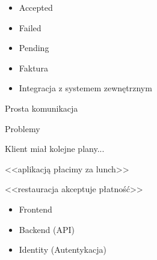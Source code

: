 \documentclass{beamer}
\begin{document}
\begin{frame}{}
	\begin{huge}
		\begin{itemize}[<+->]
			\item Accepted
			\item Failed
			\item Pending
		\end{itemize}
	\end{huge}
\end{frame}

\begin{frame}{}
	\begin{huge}
		\begin{itemize}[<+->]
			\item Faktura
			\item Integracja z systemem zewnętrznym
		\end{itemize}
	\end{huge}
\end{frame}

\begin{frame}{}
	\begin{center}
		\huge{Prosta komunikacja}
	\end{center}
\end{frame}

\begin{frame}{}
	\begin{center}
		\huge{Problemy}
	\end{center}
\end{frame}

\begin{frame}{}
	\begin{center}
		\Huge{Klient miał kolejne plany...}
	\end{center}
\end{frame}

\begin{frame}{}
	\begin{center}
		\huge{<<aplikacją płacimy za lunch>>}
	\end{center}
\end{frame}

\begin{frame}{}
	\begin{center}
		\huge{<<restauracja akceptuje płatność>>}
	\end{center}
\end{frame}

\begin{frame}{}
	\begin{huge}
		\begin{itemize}
			\item Frontend
			\item Backend (API)
			\item Identity (Autentykacja)
		\end{itemize}
	\end{huge}
\end{frame}
\end{document}
